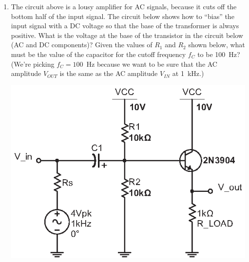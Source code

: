 \begin{enumerate}[wide]
\item The circuit above is a lousy amplifier for AC signals, because it cuts off the bottom half of the input signal.  The circuit below shows how to ``bias'' the input signal with a DC voltage so that the base of the transformer is always positive.  What is the voltage at the base of the transistor in the circuit below (AC and DC components)?  Given the values of $R_1$ and $R_2$ shown below, what must be the value of the capacitor for the cutoff frequency $f_C$ to be 100~Hz?  (We're picking $f_C=100$~Hz because we want to be sure that the AC amplitude $V_{OUT}$ is the same as the AC amplitude $V_{IN}$ at 1~kHz.)
\begin{center}
\vspace{-0.08in}
\includegraphics{bjt/emit_follower_biased_input.eps}
\vspace{-0.08in}
\end{center}


\end{enumerate}
